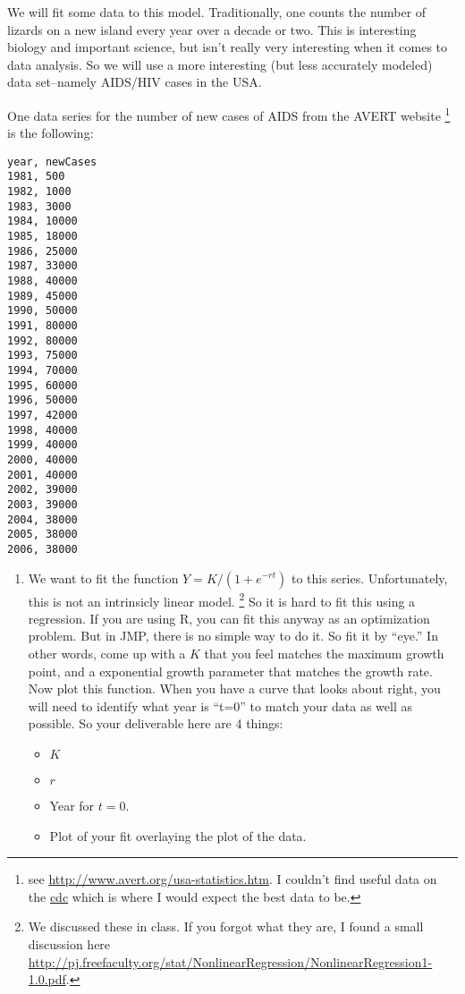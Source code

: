 \documentclass[11pt]{article}
\begin{document}
\begin{enumerate}
We will fit some data to this model.  Traditionally, one counts the
 number of lizards on a new island every year over a decade or two.
  This is interesting biology and important science, but isn't really
 very interesting when it comes to data analysis.  So we will use a
 more interesting (but less accurately modeled) data set--namely
 AIDS/HIV cases in the USA.

One data series for the number of new cases of AIDS from the AVERT
website%
\footnote{see
\href{http://www.avert.org/usa-statistics.htm}{http://www.avert.org/usa-statistics.htm}.
I couldn't find useful data on the
\href{http://www.cdc.gov/Hiv/topics/surveillance/resources/factsheets/incidence.htm}{cdc}
which is where I would expect the best data to be.}
is the following:
\newpage

\begin{verbatim}
year, newCases 
1981, 500
1982, 1000
1983, 3000
1984, 10000
1985, 18000
1986, 25000
1987, 33000
1988, 40000
1989, 45000
1990, 50000
1991, 80000
1992, 80000
1993, 75000
1994, 70000
1995, 60000
1996, 50000
1997, 42000
1998, 40000
1999, 40000
2000, 40000
2001, 40000
2002, 39000
2003, 39000
2004, 38000
2005, 38000
2006, 38000
\end{verbatim}
\begin{enumerate}
\item We want to fit the function $Y = K/(1+e^{-rt})$ to this series.
Unfortunately, this is not an intrinsicly linear model.%
\footnote{We discussed these in class.  If you forgot what they are, I
found a small discussion here \href{http://pj.freefaculty.org/stat/NonlinearRegression/NonlinearRegression1-1.0.pdf}{http://pj.freefaculty.org/stat/NonlinearRegression/NonlinearRegression1-1.0.pdf}.}
So it is hard to fit this using a regression.  If you are using R, you
can fit this anyway as an optimization problem.  But in JMP, there is
no simple way to do it.  So fit it by ``eye.''  In other words, come
up with a $K$ that you feel matches the maximum growth point, and a
exponential growth parameter that matches the growth rate.  Now plot
this function.  When you have a curve that looks about right, you will
need to identify what year is ``t=0'' to match your data as well as
possible.   So your deliverable here are 4 things:
\begin{itemize}
\item $K$
\item $r$
\item Year for $t=0$.
\item Plot of your fit overlaying the plot of the data.

\end{itemize}
\end{enumerate}
\end{enumerate}
\end{document}
